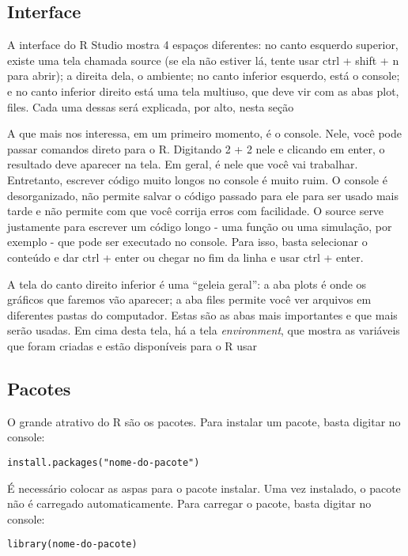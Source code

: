 \documentclass[]{book}
\begin{document}
\subsection{Interface}\label{interface}

A interface do R Studio mostra 4 espaços diferentes: no canto esquerdo
superior, existe uma tela chamada source (se ela não estiver lá, tente
usar ctrl + shift + n para abrir); a direita dela, o ambiente; no canto
inferior esquerdo, está o console; e no canto inferior direito está uma
tela multiuso, que deve vir com as abas plot, files. Cada uma dessas
será explicada, por alto, nesta seção

A que mais nos interessa, em um primeiro momento, é o console. Nele,
você pode passar comandos direto para o R. Digitando 2 + 2 nele e
clicando em enter, o resultado deve aparecer na tela. Em geral, é nele
que você vai trabalhar. Entretanto, escrever código muito longos no
console é muito ruim. O console é desorganizado, não permite salvar o
código passado para ele para ser usado mais tarde e não permite com que
você corrija erros com facilidade. O source serve justamente para
escrever um código longo - uma função ou uma simulação, por exemplo -
que pode ser executado no console. Para isso, basta selecionar o
conteúdo e dar ctrl + enter ou chegar no fim da linha e usar ctrl +
enter.

A tela do canto direito inferior é uma ``geleia geral'': a aba plots é
onde os gráficos que faremos vão aparecer; a aba files permite você ver
arquivos em diferentes pastas do computador. Estas são as abas mais
importantes e que mais serão usadas. Em cima desta tela, há a tela
\emph{environment}, que mostra as variáveis que foram criadas e estão
disponíveis para o R usar

\subsection{Pacotes}\label{pacotes}

O grande atrativo do R são os pacotes. Para instalar um pacote, basta
digitar no console:

\begin{verbatim}
install.packages("nome-do-pacote")
\end{verbatim}

É necessário colocar as aspas para o pacote instalar. Uma vez instalado,
o pacote não é carregado automaticamente. Para carregar o pacote, basta
digitar no console:

\begin{verbatim}
library(nome-do-pacote)
\end{verbatim}
\end{document}
